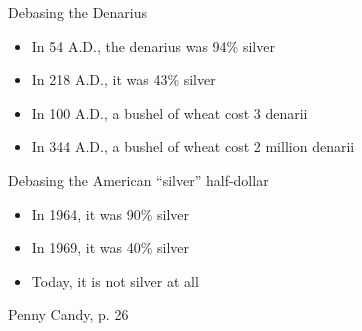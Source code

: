 {    
\begin{frame}{Debasing the Denarius}
    \begin{itemize}
        \item In 54 A.D., the denarius was 94\% silver
        \item In 218 A.D., it was 43\% silver
        \item In 100 A.D., a bushel of wheat cost 3 denarii
        \item In 344 A.D., a bushel of wheat cost 2 million denarii
    \end{itemize}
\end{frame}
}

{
\begin{frame}{Debasing the American ``silver'' half-dollar}
    \begin{itemize}
        \item In 1964, it was 90\% silver
        \item In 1969, it was 40\% silver
        \item Today, it is not silver at all
    \end{itemize}
    \vspace{63pt}
    \begin{minipage}[b]{\textwidth}
    \hfill \small{Penny Candy, p. 26}
    \end{minipage}
\end{frame}
}

